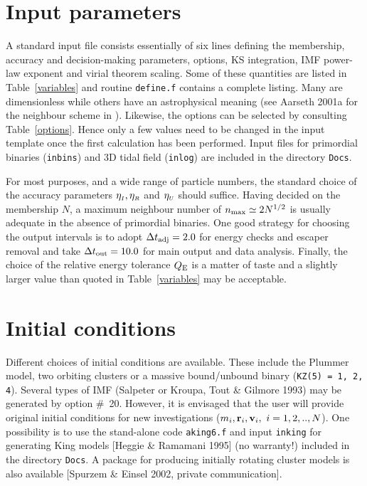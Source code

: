 \documentclass[12pt]{article}
\begin{document}
\section{Input parameters}

A standard input file consists essentially of six lines defining the
membership, accuracy and decision-making parameters, options, KS
integration, IMF power-law exponent and virial theorem scaling.
Some of these quantities are listed in Table~\ref{variables} and
routine {\tt define.f} contains a complete listing.
Many are dimensionless while others have an astrophysical meaning
(see Aarseth 2001a for the neighbour scheme in {}).
Likewise, the options can be selected by consulting Table~\ref{options}.
Hence only a few values need to be changed in the input template once the
first calculation has been performed.
Input files for primordial binaries ({\tt inbins}) and 3D tidal field
({\tt inlog}) are included in the directory {\tt Docs}.

For most purposes, and a wide range of particle numbers, the standard choice
of the accuracy parameters $\eta_{\scriptscriptstyle I}, \eta_{\scriptscriptstyle R}$ and $\eta_{\scriptscriptstyle U}$ should suffice.
Having decided on the membership $N$, a maximum neighbour number of
$n_{\rm max} \simeq 2 N^{1/2}$ is usually adequate in the absence of
primordial binaries.
One good strategy for choosing the output intervals is to adopt
$\Delta t_{\rm adj} = 2.0$ for energy checks and escaper removal and take
$\Delta t_{\rm out} = 10.0$ for main output and data analysis.
Finally, the choice of the relative energy tolerance $Q_{\rm E}$ is a matter
of taste and a slightly larger value than quoted in Table~\ref{variables}
may be acceptable.

\section{Initial conditions}

Different choices of initial conditions are available.
These include the Plummer model, two orbiting clusters or a massive
bound/unbound  binary ({\tt KZ(5) = 1, 2, 4}).
Several types of IMF (Salpeter or Kroupa, Tout \& Gilmore 1993) may be
generated by option \#~20.
However, it is envisaged that the user will provide original initial
conditions for new investigations
($m_i, {\bf r}_i, {\bf v}_i, ~i = 1, 2, .., N$).
One possibility is to use the stand-alone code {\tt aking6.f} and input
{\tt inking} for generating King models [Heggie \& Ramamani 1995]
(no warranty!) included in the directory {\tt Docs}.
A package for producing initially rotating cluster models is also available
[Spurzem \& Einsel 2002, private communication].
\end{document}

